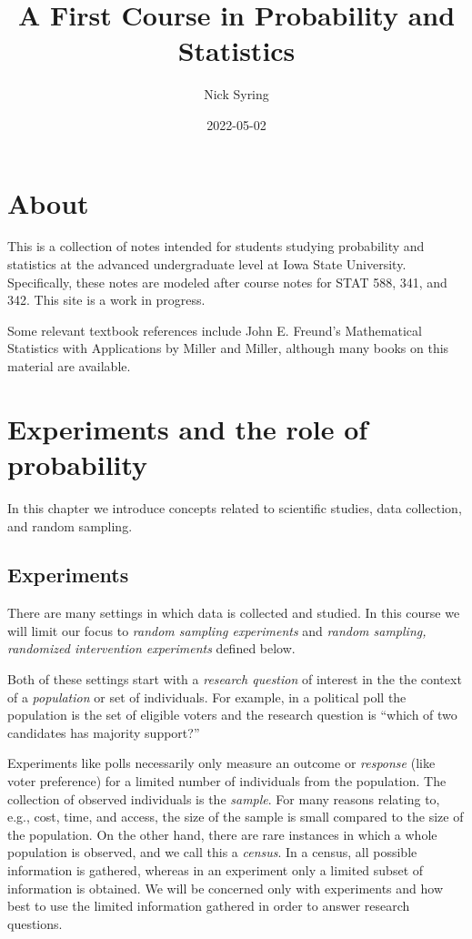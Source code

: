 \documentclass[]{book}
\title{A First Course in Probability and Statistics}
\author{Nick Syring}
\date{2022-05-02}
\begin{document}
\maketitle

{
\setcounter{tocdepth}{1}
\tableofcontents
}
\chapter{About}\label{about}

This is a collection of notes intended for students studying probability
and statistics at the advanced undergraduate level at Iowa State
University. Specifically, these notes are modeled after course notes for
STAT 588, 341, and 342. This site is a work in progress.

Some relevant textbook references include John E. Freund's Mathematical
Statistics with Applications by Miller and Miller, although many books
on this material are available.

\chapter{Experiments and the role of
probability}\label{experiments-and-the-role-of-probability}

In this chapter we introduce concepts related to scientific studies,
data collection, and random sampling.

\section{Experiments}\label{experiments}

There are many settings in which data is collected and studied. In this
course we will limit our focus to \emph{random sampling experiments} and
\emph{random sampling, randomized intervention experiments} defined
below.

Both of these settings start with a \emph{research question} of interest
in the the context of a \emph{population} or set of individuals. For
example, in a political poll the population is the set of eligible
voters and the research question is ``which of two candidates has
majority support?''

Experiments like polls necessarily only measure an outcome or
\emph{response} (like voter preference) for a limited number of
individuals from the population. The collection of observed individuals
is the \emph{sample}. For many reasons relating to, e.g., cost, time,
and access, the size of the sample is small compared to the size of the
population. On the other hand, there are rare instances in which a whole
population is observed, and we call this a \emph{census}. In a census,
all possible information is gathered, whereas in an experiment only a
limited subset of information is obtained. We will be concerned only
with experiments and how best to use the limited information gathered in
order to answer research questions.
\end{document}
